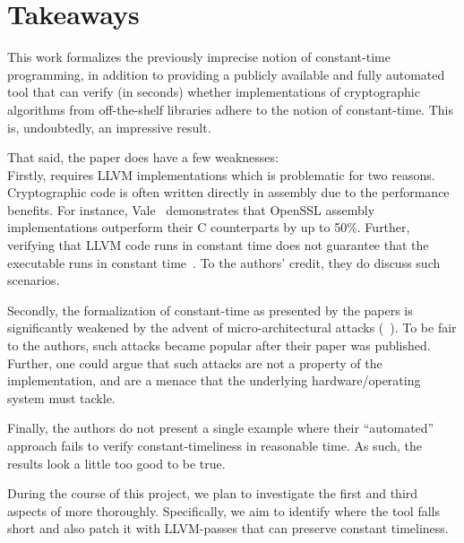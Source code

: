 \section{Takeaways}

This work formalizes the previously imprecise notion of constant-time programming, in addition to providing a publicly available and fully automated tool that can verify (in seconds) whether implementations of cryptographic algorithms from off-the-shelf libraries adhere to the notion of constant-time.
This is, undoubtedly, an impressive result.

That said, the paper does have a few weaknesses: \\
\indent Firstly, \ctVerif requires LLVM implementations which is problematic for two reasons.
Cryptographic code is often written directly in assembly due to the performance benefits. For instance, Vale~\cite{vale} demonstrates that OpenSSL assembly implementations outperform their C counterparts by up to 50\%.
Further, verifying that LLVM code runs in constant time does not guarantee that the executable runs in constant time~\cite{KaufmannPVV16}. To the authors' credit, they do discuss such scenarios.

Secondly, the formalization of constant-time as presented by the papers is significantly weakened by the advent of micro-architectural attacks (~\cite{meltdown, spectre}). To be fair to the authors, such attacks became popular after their paper was published. Further, one could argue that such attacks are not a property of the implementation, and are a menace that the underlying hardware/operating system must tackle.

Finally, the authors do not present a single example where their ``automated'' approach fails to verify constant-timeliness in reasonable time. As such, the results look a little too good to be true.

During the course of this project, we plan to investigate the first and third aspects of \ctVerif more thoroughly.
Specifically, we aim to identify where the tool falls short and also patch it with LLVM-passes that can preserve constant timeliness.

